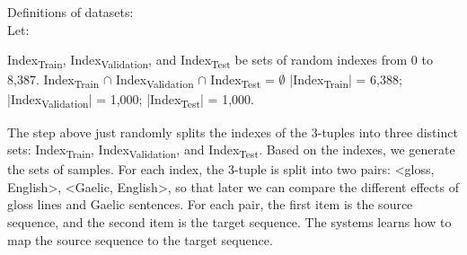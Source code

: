 \begin{exe}
\ex Definitions of datasets:\\
	Let:
	\begin{xlist}
	\ex 	Index\textsubscript{Train}, Index\textsubscript{Validation}, and Index\textsubscript{Test} be sets of random indexes from 0 to 8,387.
   \ex		Index\textsubscript{Train} $\cap$ Index\textsubscript{Validation} $\cap$ Index\textsubscript{Test} = $\emptyset$
   \ex 	|Index\textsubscript{Train}| = 6,388; |Index\textsubscript{Validation}| = 1,000; |Index\textsubscript{Test}| = 1,000.
   \end{xlist}
\end{exe}
The step above just randomly splits the indexes of the 3-tuples into three distinct sets: Index\textsubscript{Train}, Index\textsubscript{Validation}, and Index\textsubscript{Test}. Based on the indexes, we generate the sets of samples. For each index, the 3-tuple is split into two pairs: <gloss, English>, <Gaelic, English>, so that later we can compare the different effects of gloss lines and Gaelic sentences. For each pair, the first item is the source sequence, and the second item is the target sequence. The systems learns how to map the source sequence to the target sequence.   

